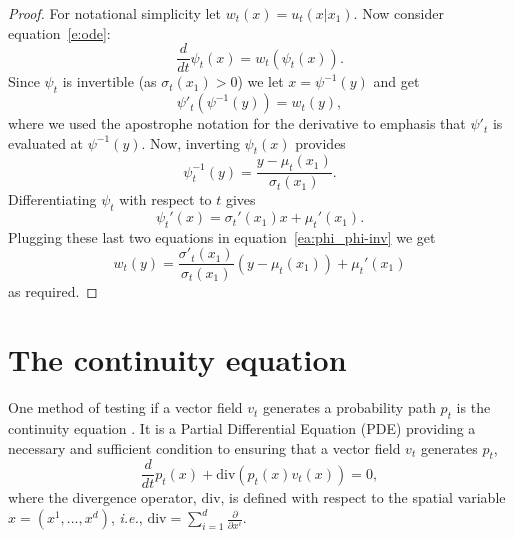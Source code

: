 \documentclass{article}
\makeatletter
\newcommand{\parr}[1]{\left (#1\right )}
\newcommand{\divv}{\mathrm{div}} %
\newcommand{\ie}{{i.e.}}
\def\eqref#1{equation~\ref{#1}}
\renewcommand*{\ie}{{\it i.e.}\@\xspace}
\makeatother
\begin{document}
\condvf*
\begin{proof}
For notational simplicity let $w_t(x)=u_t(x\vert x_1)$. Now consider \eqref{e:ode}:
\begin{equation*}
    \frac{d}{dt}\psi_t(x) = w_t(\psi_t(x)).
\end{equation*}
Since $\psi_t$ is invertible (as $\sigma_t(x_1)>0$) we let $x=\psi^{-1}(y)$ and get
\begin{equation}\label{ea:phi_phi-inv}
    \psi'_t(\psi^{-1}(y)) = w_t(y),
\end{equation}
where we used the apostrophe notation for the derivative to emphasis that $\psi'_t$ is evaluated at $\psi^{-1}(y)$. Now, inverting $\psi_t(x)$ provides
\begin{equation*}
    \psi_t^{-1}(y)=\frac{y-\mu_t(x_1)}{\sigma_t(x_1)}.
\end{equation*}
Differentiating $\psi_t$ with respect to $t$ gives
\begin{equation*}
    \psi_t'(x)=\sigma_t'(x_1)x + \mu_t'(x_1).
\end{equation*}
Plugging these last two equations in \eqref{ea:phi_phi-inv} we get
\begin{equation*}
    w_t(y) = \frac{\sigma'_t(x_1)}{\sigma_t(x_1)}\parr{y-\mu_t(x_1)} + \mu_t'(x_1)
\end{equation*}
as required. 
\end{proof}


\section{The continuity equation}
\label{A:continuity_equation}
One method of testing if a vector field $v_t$ generates a probability path $p_t$ is the continuity equation \citep{villani2009optimal}. It is a Partial Differential Equation (PDE) providing a necessary and sufficient condition to ensuring that a vector field $v_t$ generates $p_t$,
\begin{equation}\label{e:continuity}
    \frac{d}{dt}p_t(x) + \divv(p_t(x) v_t(x)) = 0,
\end{equation}
where the divergence operator, $\divv$, is defined with respect to the spatial variable $x=(x^1,\ldots,x^d)$, \ie, $\divv=\sum_{i=1}^d \frac{\partial }{\partial x^i}$. 

\end{document}
